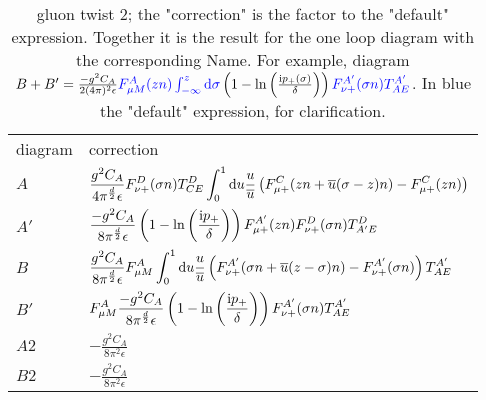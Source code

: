 \def\verticaldistance{\vspace{0.5cm}}
\begin{table}
	\begin{tabular}{p{2cm}p{14cm}}
		diagram&correction \\
		$A$ & ${\displaystyle \frac{g^2C_A}{4\pi^{\frac{d}{2}}\epsilon}F_{\nu +} ^D(\sigma n) T^D_{CE}\int _0^1 \text{d} u \frac{u}{\overline u} \left(F_{\mu +}^C (zn+ \overline u(\sigma -z) n) - F_{\mu +}^C(zn)\right)}$\verticaldistance \\
		$A'$ & ${\displaystyle \frac{-g^2C_A}{8\pi^{\frac{d}{2}}\epsilon}\left(1-\ln\left(\frac{\text{i} p_{+}}{\delta}\right)\right)F_{\mu +}^{A'}(zn)F _{\nu +}^D(\sigma n)T^D_{A'E} }$\verticaldistance \\
		$B$ & ${\displaystyle \frac{g^2C_A}{8\pi^{\frac{d}{2}}\epsilon} F_{\mu M}^{A}\int _0^1 \text{d} u \frac{u}{\overline u} \left(F_{\nu +}^{A'}(\sigma n+\overline u (z-\sigma) n)-F^{A'}_{\nu +}(\sigma n)\right)T^{A'}_{AE}}$ \verticaldistance \\
		$B'$ & ${\displaystyle 	 F_{\mu M}^{A}\frac{-g^2C_A}{8\pi^{\frac{d}{2}}\epsilon}\left(1-\ln\left(\frac{\text{i} p_{+}}{\delta}\right)\right)F_{\nu+}^{A'}(\sigma n)T^{A'}_{AE}}$\verticaldistance \\
		$A2$ & $-\frac{ g^2 C_A}{8\pi^2 \epsilon} $  \verticaldistance \\
		$B2$ & $-\frac{ g^2 C_A}{8\pi^2 \epsilon}$\verticaldistance \\
	\end{tabular}
	\caption{gluon twist 2; the "correction" is the factor to the "default" expression. Together it is the result for the one loop diagram with the corresponding Name. For example, diagram $B+B'=\frac{-g^2C_A}{2(4\pi)^2\epsilon}{\color{blue}F_{\mu M}^{A}(zn)\int_{-\infty}^z \text{d}\sigma}	\left(1-\ln\left(\frac{\text{i} p_{+}(\sigma)}{\delta}\right)\right){\color{blue}F_{\nu +}^{A'}(\sigma n)T^{A'}_{AE}}$. In blue the "default" expression, for clarification. }
	\label{Resultsgluontwist2table}
\end{table}
\ifdefined\mainprogram{}
\else

\fi
